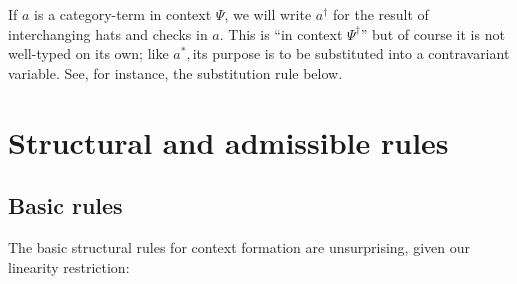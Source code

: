 \documentclass{amsart}
\let\types\vdash %
\def\type{\;\mathsf{type}}
\def\ctx{\;\mathsf{ctx}}
\let\splits\rightrightarrows
\def\flip#1{#1^*} %
\def\dual#1{#1^\dagger} %
\def\ec{\cdot} %
\def\psplit{\overset{\mathsf{pair}}{\splits}}
\def\pcol{\overset{\scriptscriptstyle +}{:}}
\def\mcol{\overset{\scriptscriptstyle -}{:}}
\newcommand{\unsigned}[1]{#1^0}
\begin{document}



If $a$ is a category-term in context $\Psi$, we will write $\dual{a}$ for the result of interchanging hats and checks in $a$.
This is ``in context $\dual{\Psi}$'' but of course it is not well-typed on its own; like $\flip{a}, $its purpose is to be substituted into a contravariant variable.
See, for instance, the substitution rule below.


\section{Structural and admissible rules}
\label{sec:structural}

\subsection{Basic rules}
\label{sec:basic-rules}

The basic structural rules for context formation are unsurprising, given our linearity restriction:
\end{document}
